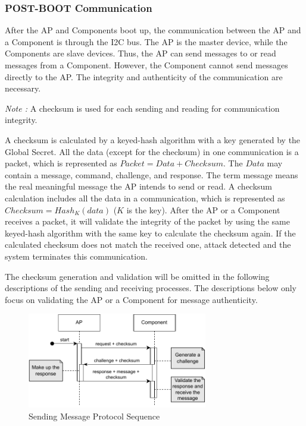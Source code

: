 \documentclass[11pt,oneside,onecolumn,letterpaper]{article}
\newcounter{alg}
\begin{document}
\subsubsection{POST-BOOT Communication}
After the AP and Components boot up,
the communication between the AP and a Component is through the I2C bus.
The AP is the master device,
while the Components are slave devices.
Thus,
the AP can send messages to or read messages from a Component.
However, the Component cannot send messages directly to the AP.
The integrity and authenticity of the communication are necessary.

\textit{Note :} A checksum is used for each sending and reading for communication integrity.

A checksum is calculated by a keyed-hash algorithm with a key generated by the Global Secret.
All the data (except for the checksum) in one communication is a packet,
which is represented as $ Packet = Data + Checksum $.
The $ Data $ may contain a message, command, challenge, and response.
The term message means the real meaningful message the AP intends to send or read.
A checksum calculation includes all the data in a communication,
which is represented as $ Checksum = Hash_K(data) $ ($ K $ is the key).
After the AP or a Component receives a packet,
it will validate the integrity of the packet by using the same keyed-hash algorithm with the same key to calculate the checksum again.
If the calculated checksum does not match the received one,
attack detected and the system terminates this communication.

The checksum generation and validation will be omitted in the following descriptions of the sending and receiving processes.
The descriptions below only focus on validating the AP or a Component for message authenticity.

\begin{figure}[h]
	\centering
	\includegraphics[width=0.7\textwidth]{pics/post1.pdf}
	\caption{Sending Message Protocol Sequence}
	\label{fig:functionality_post1}
\end{figure}
\end{document}
